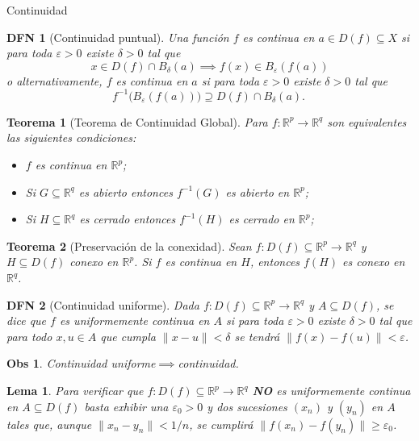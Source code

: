 \documentclass[a4paper]{article}\usepackage{/home/alonso/Documents/Projects/formularios/styles}
\title{}
\author{}
\newtheorem{definition}{DFN}
\theoremstyle{mytheoremstyle}
\newtheorem{theorem}{Teorema}
\newtheorem{lemma}{Lema}
\newtheorem*{obs}{Obs}
\newcommand{\R}{\mathbb{R}}
\newcommand{\1}{\mathds{1}}
\begin{document}
\begin{multicols*}{3}

\begin{roundbox}{Continuidad}
\begin{definition}[Continuidad puntual]
Una función $f$ es continua en $a\in D(f)\subseteq X$ si para toda $\varepsilon>0$ existe $\delta>0$ tal que
\[
   x\in D(f)\cap B_\delta(a) \implies f(x)\in B_\varepsilon(f(a))
\]
o alternativamente, $f$ es continua en $a$ si para toda $\varepsilon>0$ existe $\delta>0$ tal que
\[
f^{-1}\big(B_\varepsilon(f(a))\big)\supseteq D(f)\cap B_\delta(a).
\
\]
\end{definition}


\begin{theorem}[Teorema de Continuidad Global]
Para $f:\R^{p}\to\R^{q}$ son equivalentes las siguientes condiciones:
\begin{itemize}
\item $f$ es continua en $\R^{p}$;
\item Si $G\subseteq\R^{q}$ es abierto entonces $\displaystyle f^{-1}(G)$ es abierto en $\R^{p}$;
\item Si $H\subseteq\R^{q}$ es cerrado entonces $\displaystyle f^{-1}(H)$ es cerrado en $\R^{p}$;
\end{itemize}
\end{theorem}

\begin{theorem}[Preservación de la conexidad]
Sean $f:D(f)\subseteq\R^{p}\to\R^{q}$ y $H\subseteq D(f)$ conexo en $\R^{p}$. Si $f$ es continua en $H$, entonces $f(H)$ es conexo en $\R^{q}$.
\end{theorem}

\begin{definition}[Continuidad uniforme]
Dada $f:D(f)\subseteq\R^{p}\to\R^{q}$ y $A\subseteq D(f)$, se dice que $f$ es uniformemente continua en $A$ si para toda $\varepsilon>0$ existe $\delta>0$  tal que para todo $x,u\in A$ que cumpla $\|x-u\|<\delta$ se tendrá $\|f(x)-f(u)\|<\varepsilon$.
\end{definition}

\begin{obs}
Continuidad uniforme$\implies$continuidad.
\end{obs}

\begin{lemma}
\item Para verificar que $f:D(f)\subseteq\R^{p}\to\R^{q}$ \textbf{NO} es uniformemente continua en $A\subseteq D(f)$ basta exhibir una $\varepsilon_0>0$ y dos sucesiones $(x_n)$ y $(y_n)$ en $A$ tales que, aunque $\|x_n-y_n\|<1/n$, se cumplirá $\|f(x_n)-f(y_n)\|\geq\varepsilon_0$.
\end{lemma}


\end{roundbox}
\end{multicols*}
\end{document}
